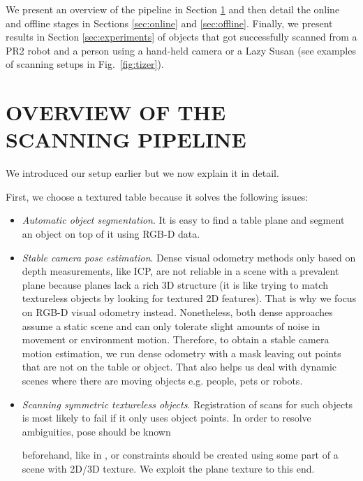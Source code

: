 \documentclass[letterpaper, 10 pt, conference]{ieeeconf}  %
\begin{document}
We present an overview of the pipeline in Section \ref{sec:overview} and then detail the online and offline stages in 
Sections \ref{sec:online} and \ref{sec:offline}. Finally, we present results in Section \ref{sec:experiments} of
objects that got successfully scanned from a PR2 robot and a person using a hand-held camera or a Lazy Susan (see 
examples of scanning setups in Fig.~\ref{fig:tizer}).


\section{OVERVIEW OF THE SCANNING PIPELINE}

\label{sec:overview}

We introduced our setup earlier but we now explain it in detail.

First, we choose a textured table because it solves the following issues:

\begin{itemize}

\item \textit{Automatic object segmentation}. It is easy to find a table plane and segment an object on top of 
it using RGB-D data.
\item \textit{Stable camera pose estimation}. Dense visual odometry methods only based on depth measurements,
like ICP, are not reliable in a scene with a prevalent plane \cite{rusinkiewicz2002real}
because planes lack a rich 3D structure (it is like trying to match textureless objects by looking for textured 2D 
features). That is why we focus on RGB-D visual odometry instead. Nonetheless, both dense approaches
assume a static scene and can only tolerate slight amounts of noise in movement or environment motion. Therefore,
to obtain a stable camera motion estimation, we run dense odometry with a mask leaving out points that are not on 
the table or object. That also helps us deal with dynamic scenes where there are moving objects e.g. people, pets or 
robots.
\item \textit{Scanning symmetric textureless objects}. Registration of scans for such objects
is most likely to fail if it only uses object points. In order to resolve ambiguities, pose should be known 

beforehand, like in \cite{krainin2011manipulator},
or constraints should be created using some part of a scene with
2D/3D texture. We exploit the plane texture to this end.
\end{itemize}
\end{document}
